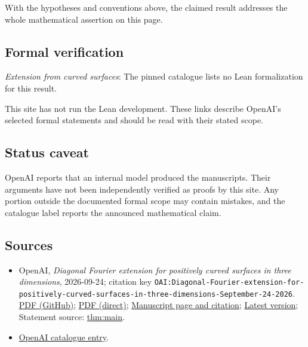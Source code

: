 \documentclass[11pt]{article}
\begin{document}
With the hypotheses and conventions above, the claimed result addresses the whole mathematical assertion on this page.

\subsection{Formal verification}
\textit{Extension from curved surfaces}: The pinned catalogue lists no Lean formalization for this result.

This site has not run the Lean development. These links describe OpenAI’s selected formal statements and should be read with their stated scope.

\subsection{Status caveat}
OpenAI reports that an internal model produced the manuscripts. Their arguments have not been independently verified as proofs by this site. Any portion outside the documented formal scope may contain mistakes, and the catalogue label reports the announced mathematical claim.

\subsection{Sources}
\begin{itemize}
\item OpenAI, \emph{Diagonal Fourier extension for positively curved surfaces in three dimensions}, 2026-09-24; citation key \texttt{OAI:Diagonal-Fourier-extension-for-positively-curved-surfaces-in-three-dimensions-September-24-2026}. \href{https://github.com/openai/math/blob/adc7f1241b42e322a6451854ab7e4b4c146bf78a/preprints/Diagonal-Fourier-extension-for-positively-curved-surfaces-in-three-dimensions-September-24-2026/Diagonal-Fourier-extension-for-positively-curved-surfaces-in-three-dimensions-September-24-2026.pdf}{PDF (GitHub)}; \href{https://github.com/openai/math/raw/adc7f1241b42e322a6451854ab7e4b4c146bf78a/preprints/Diagonal-Fourier-extension-for-positively-curved-surfaces-in-three-dimensions-September-24-2026/Diagonal-Fourier-extension-for-positively-curved-surfaces-in-three-dimensions-September-24-2026.pdf}{PDF (direct)}; \href{https://github.com/openai/math/blob/adc7f1241b42e322a6451854ab7e4b4c146bf78a/preprints/Diagonal-Fourier-extension-for-positively-curved-surfaces-in-three-dimensions-September-24-2026/README.md}{Manuscript page and citation}; \href{https://github.com/openai/math/blob/main/preprints/Diagonal-Fourier-extension-for-positively-curved-surfaces-in-three-dimensions-September-24-2026/Diagonal-Fourier-extension-for-positively-curved-surfaces-in-three-dimensions-September-24-2026.pdf}{Latest version}; Statement source: \href{https://github.com/openai/math/blob/adc7f1241b42e322a6451854ab7e4b4c146bf78a/preprints/Diagonal-Fourier-extension-for-positively-curved-surfaces-in-three-dimensions-September-24-2026/build/sections/00-introduction.tex\#L18}{thm:main}.
\item \href{https://github.com/openai/math/blob/adc7f1241b42e322a6451854ab7e4b4c146bf78a/CONTENTS.md}{OpenAI catalogue entry}.
\end{itemize}
\end{document}
